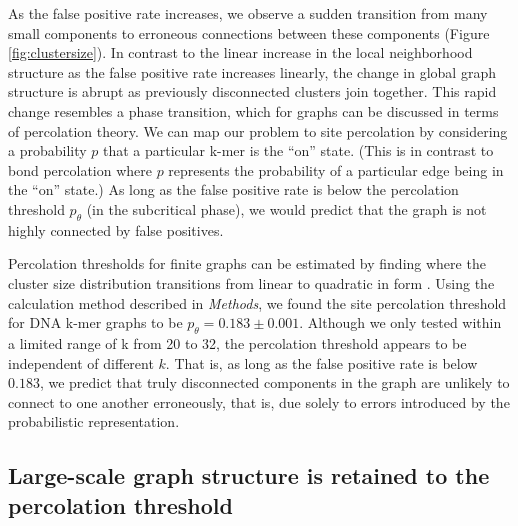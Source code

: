 \documentclass{pnastwo}
\begin{document}
\begin{article}
As the false positive rate increases, we observe a sudden transition
from many small components to erroneous connections between these
components (Figure \ref{fig:clustersize}).  In contrast to the linear increase in the
local neighborhood structure as the false positive rate increases
linearly, the change in global graph structure is abrupt as previously
disconnected clusters join together.  This rapid change resembles a
phase transition, which for graphs can be discussed in terms of
percolation theory. We can map our problem to site percolation by
considering a probability $p$ that a particular k-mer is the ``on''
state. (This is in contrast to bond percolation where $p$ represents
the probability of a particular edge being in the ``on'' state.) As
long as the false positive rate is below the percolation threshold
$p_\theta$ (in the subcritical phase), we would predict that the graph
is not highly connected by false positives.


Percolation thresholds for finite graphs can be estimated by finding
where the cluster size distribution transitions from linear to
quadratic in form \cite{stauffer1979scaling}.  Using the calculation
method described in \emph{Methods}, we found the site percolation
threshold for DNA k-mer graphs to be $p_\theta = 0.183 \pm 0.001$.
Although we only tested within a limited range of k from 20 to 32, the
percolation threshold appears to be independent of different $k$.
That is, as long as the false positive rate is below $0.183$, we
predict that truly disconnected components in the graph are unlikely
to connect to one another erroneously, that is, due solely to errors
introduced by the probabilistic representation.

\subsection{Large-scale graph structure is retained to the percolation threshold}


\end{article}
\end{document}
